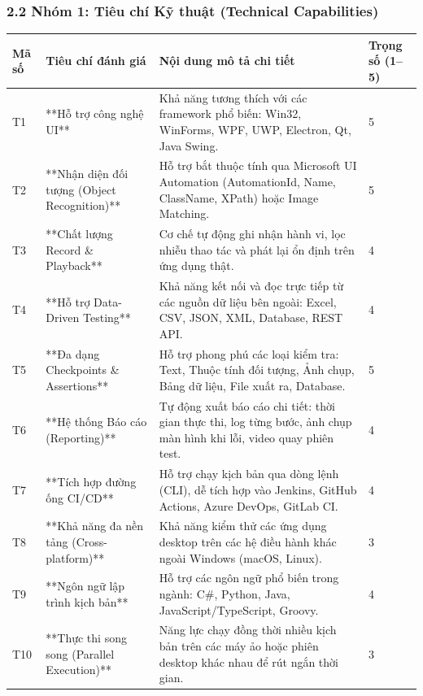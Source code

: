 \subsubsection{2.2 Nhóm 1: Tiêu chí Kỹ thuật (Technical Capabilities)}

\begin{table}[H]
\centering
\begin{tabular}{|l|l|l|l|}
\hline
\textbf{Mã số} & \textbf{Tiêu chí đánh giá} & \textbf{Nội dung mô tả chi tiết} & \textbf{Trọng số (1–5)} \\ \hline
T1 & **Hỗ trợ công nghệ UI** & Khả năng tương thích với các framework phổ biến: Win32, WinForms, WPF, UWP, Electron, Qt, Java Swing. & 5 \\ \hline
T2 & **Nhận diện đối tượng (Object Recognition)** & Hỗ trợ bắt thuộc tính qua Microsoft UI Automation (AutomationId, Name, ClassName, XPath) hoặc Image Matching. & 5 \\ \hline
T3 & **Chất lượng Record \& Playback** & Cơ chế tự động ghi nhận hành vi, lọc nhiễu thao tác và phát lại ổn định trên ứng dụng thật. & 4 \\ \hline
T4 & **Hỗ trợ Data-Driven Testing** & Khả năng kết nối và đọc trực tiếp từ các nguồn dữ liệu bên ngoài: Excel, CSV, JSON, XML, Database, REST API. & 4 \\ \hline
T5 & **Đa dạng Checkpoints \& Assertions** & Hỗ trợ phong phú các loại kiểm tra: Text, Thuộc tính đối tượng, Ảnh chụp, Bảng dữ liệu, File xuất ra, Database. & 5 \\ \hline
T6 & **Hệ thống Báo cáo (Reporting)** & Tự động xuất báo cáo chi tiết: thời gian thực thi, log từng bước, ảnh chụp màn hình khi lỗi, video quay phiên test. & 4 \\ \hline
T7 & **Tích hợp đường ống CI/CD** & Hỗ trợ chạy kịch bản qua dòng lệnh (CLI), dễ tích hợp vào Jenkins, GitHub Actions, Azure DevOps, GitLab CI. & 4 \\ \hline
T8 & **Khả năng đa nền tảng (Cross-platform)** & Khả năng kiểm thử các ứng dụng desktop trên các hệ điều hành khác ngoài Windows (macOS, Linux). & 3 \\ \hline
T9 & **Ngôn ngữ lập trình kịch bản** & Hỗ trợ các ngôn ngữ phổ biến trong ngành: C#, Python, Java, JavaScript/TypeScript, Groovy. & 4 \\ \hline
T10 & **Thực thi song song (Parallel Execution)** & Năng lực chạy đồng thời nhiều kịch bản trên các máy ảo hoặc phiên desktop khác nhau để rút ngắn thời gian. & 3 \\ \hline
\end{tabular}
\end{table}





